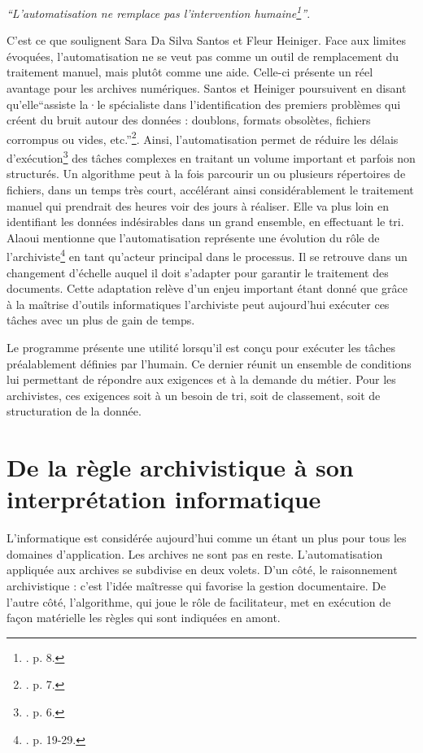 \begin{displayquote}
	\textit{\enquote{L'automatisation ne remplace pas l'intervention humaine\footnote{\cite{da-silva-santos-heiniger-2024}. p. 8.}}}.
\end{displayquote}
C'est ce que soulignent Sara Da Silva Santos et Fleur Heiniger. Face aux limites évoquées, l’automatisation ne se veut pas comme un outil de remplacement du traitement manuel, mais plutôt comme une aide. Celle-ci présente un réel avantage pour les archives numériques. Santos et Heiniger poursuivent en disant qu'elle\enquote{assiste la·le spécialiste dans l’identification des premiers problèmes qui créent du bruit autour des données : doublons, formats obsolètes, fichiers corrompus ou vides, etc.}\footnote{\cite{da-silva-santos-heiniger-2024}. p. 7.}. Ainsi, l'automatisation permet de réduire les délais d’exécution\footnote{\cite{da-silva-santos-heiniger-2024}. p. 6.} des tâches complexes en traitant un volume important et parfois non structurés. Un algorithme peut à la fois parcourir un ou plusieurs répertoires de fichiers, dans un temps très court, accélérant ainsi considérablement le traitement manuel qui prendrait des heures voir des jours à réaliser. Elle va plus loin en identifiant les données indésirables dans un grand ensemble, en effectuant le tri. Alaoui mentionne que l'automatisation représente une évolution du rôle de l'archiviste\footnote{\cite{alaoui2024automatisation}. p. 19-29.} en tant qu'acteur principal dans le processus. Il se retrouve dans un changement d'échelle auquel il doit s'adapter pour garantir le traitement des  documents. Cette adaptation relève d'un enjeu important étant donné que grâce à la maîtrise d'outils informatiques l'archiviste peut aujourd'hui exécuter ces tâches avec un plus de gain de temps.

Le programme présente une utilité lorsqu'il est conçu pour exécuter les tâches préalablement définies par l'humain. Ce dernier réunit un ensemble de conditions lui permettant de répondre aux exigences et à la demande du métier. Pour les archivistes, ces exigences soit à un besoin de tri, soit de classement, soit de structuration de la donnée. 



\section{De la règle archivistique à son interprétation informatique}

L'informatique est considérée aujourd'hui comme un étant un plus pour tous les domaines d'application. Les archives ne sont pas en reste. L’automatisation appliquée aux archives se subdivise en deux volets. D'un côté, le raisonnement archivistique : c'est l'idée maîtresse qui favorise la gestion documentaire. De l'autre côté, l'algorithme, qui joue le rôle de facilitateur, met en exécution de façon matérielle les règles qui sont indiquées en amont.

